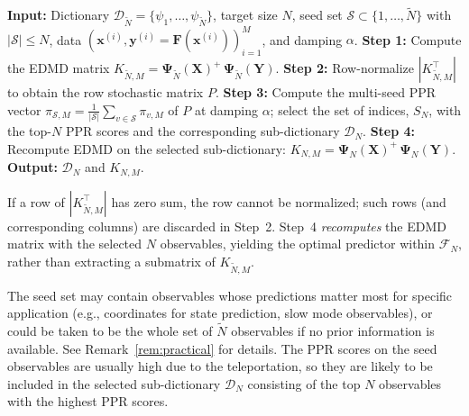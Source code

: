 \documentclass{article}
\theoremstyle{plain}
\theoremstyle{definition}
\def\tp{\intercal}
\def\X{\mathbf{X}}
\def\x{\mathbf{x}}
\def\Y{\mathbf{Y}}
\def\y{\mathbf{y}}
\def\Fc{\mathcal{F}}
\def\Dc{\mathcal{D}}
\newcommand{\arXivtag}[1][]{#1}
\begin{document}
	\begin{algorithm}
		\caption{Sub-dictionary selection via Personalized PageRank on the EDMD matrix}
		\begin{algorithmic}\label{algor:PR-EDMD}
			\STATE \textbf{Input:} Dictionary $\Dc_{\tilde{N}} = \{ \psi_1, \ldots, \psi_{\tilde{N}}\}$, target size $N$, seed set $\mathcal{S} \subset \{1,\ldots,\tilde{N}\}$ with $|\mathcal{S}|\leq N$, data $(\x^{(i)}, \y^{(i)} = \mathbf{F}(\x^{(i)}))_{i=1}^M$, and damping $\alpha$.
			\STATE \textbf{Step 1:} Compute the EDMD matrix $K_{\tilde{N},M} = \mathbf{\Psi}_{\tilde{N}}(\X)^{+}\,\mathbf{\Psi}_{\tilde{N}}(\Y)$.
			\STATE \textbf{Step 2:} Row-normalize $|K_{\tilde{N},M}^{\tp}|$ to obtain the row stochastic matrix $P$. 
			\STATE \textbf{Step 3:} Compute the multi-seed PPR vector ${\pi}_{\mathcal{S}, M} = \frac{1}{|\mathcal{S}|}\sum_{v \in \mathcal{S}}{\pi}_{v,M}$ of $P$ at damping $\alpha$; select the set of indices, $S_N$, with the top-$N$ PPR scores and the corresponding sub-dictionary $\Dc_N$. 
			\STATE \textbf{Step 4:} Recompute EDMD on the selected sub-dictionary:
			$K_{N,M} = \mathbf{\Psi}_N(\X)^{+}\,\mathbf{\Psi}_N(\Y)$.
			\STATE \textbf{Output:} $\Dc_N$ and $K_{N,M}$.
		\end{algorithmic}
	\end{algorithm}
	\arXivtag[If a row of $|K_{\tilde{N},M}^{\tp}|$ has zero sum, the row cannot be normalized; such rows (and corresponding columns) are] discarded in Step~2. Step~4 \emph{recomputes} the EDMD matrix with the selected $N$ observables, yielding the optimal predictor within $\Fc_N$, rather than extracting a submatrix of $K_{\tilde{N},M}$. 
	
	The seed set may contain observables whose  predictions matter most for specific application (e.g., coordinates for state prediction, slow mode observables), or could be taken to be the whole set of $\tilde{N}$ observables if no prior information is available. See Remark~\ref{rem:practical} for details. The PPR scores on the seed observables are usually high due to the teleportation, so they are likely to be included in the selected sub-dictionary $\Dc_N$ consisting of the top $N$ observables with the highest PPR scores. 
	
\end{document}
